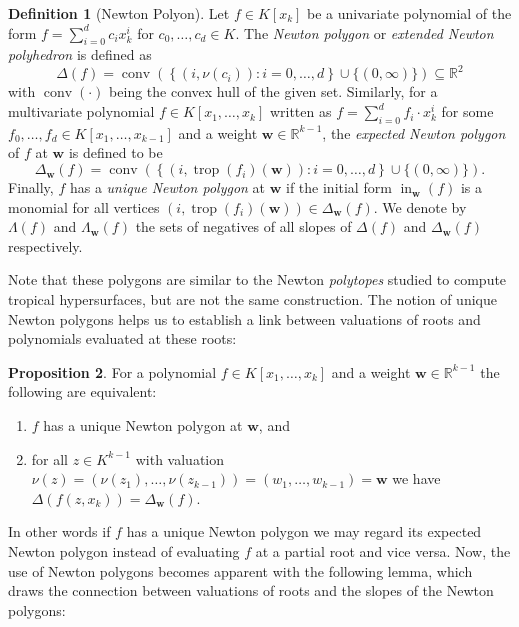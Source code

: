\documentclass[
  paper=a4,
  titlepage,
  bibliography=totoc,
  listof=totoc,
  pagesize=pdftex
]{scrartcl}
\numberwithin{figure}{section}
\numberwithin{equation}{section}
\numberwithin{table}{section}
\newcommand*\setR{\mathds{R}}
\let\vec\mathbf
\DeclareMathOperator{\trop}{trop}
\DeclareMathOperator{\initial}{in}
\DeclareMathOperator{\conv}{conv}
\theoremstyle{definition}
\newtheorem{definition}{Definition}
\newtheorem{proposition}[definition]{Proposition}
\numberwithin{definition}{section}
\begin{document}
\begin{definition}[Newton Polyon]
  Let $f \in K[x_k]$ be a univariate polynomial of the form $f = \sum_{i=0}^d c_i x_k^i$
  for $c_0, \dots, c_d \in K$. The \emph{Newton polygon} or \emph{extended Newton
  polyhedron} is defined as
  \[
    \Delta(f) = \conv \left(
      \left\{ (i, \nu(c_i)) : i = 0, \dots, d \right\}
      \cup \{ (0, \infty) \}
    \right)
    \subseteq \setR^2
  \]
  with $\conv(\cdot)$ being the convex hull of the given set. Similarly, for a
  multivariate polynomial $f \in K[x_1, \dots, x_k]$ written as $f = \sum_{i=0}^d f_i
  \cdot x_k^i$ for some $f_0, \dots, f_d \in K[x_1, \dots, x_{k-1}]$ and a weight $\vec w
  \in \setR^{k-1}$, the \emph{expected Newton polygon} of $f$ at $\vec w$ is defined to be
  \[
    \Delta_{\vec w}(f) = \conv\left(
      \left\{ (i, \trop(f_i)(\vec w)) : i = 0, \dots, d \right\}
      \cup \{ (0, \infty) \}
    \right).
  \]
  Finally, $f$ has a \emph{unique Newton polygon} at $\vec w$ if the initial form
  $\initial_{\vec w}(f)$ is a monomial for all vertices $(i, \trop(f_i)(\vec w)) \in
  \Delta_{\vec w}(f)$. We denote by $\Lambda(f)$ and $\Lambda_{\vec w}(f)$ the sets of
  negatives of all slopes of $\Delta(f)$ and $\Delta_{\vec w}(f)$ respectively.
  \label{def:newtonPoly}
\end{definition}

Note that these polygons are similar to the Newton \emph{polytopes} studied to compute
tropical hypersurfaces, but are not the same construction. The notion of unique Newton
polygons helps us to establish a link between valuations of roots and polynomials
evaluated at these roots:

\begin{proposition}
  \label{prp:expectedNewt}
  For a polynomial $f \in K[x_1, \dots, x_k]$ and a weight $\vec w \in \setR^{k-1}$ the
  following are equivalent:
  \begin{enumerate}
    \item $f$ has a unique Newton polygon at $\vec w$, and
    \item for all $z \in K^{k-1}$ with valuation $\nu(z) = (\nu(z_1), \dots, \nu(z_{k-1}))
      = (w_1, \dots, w_{k-1}) = \vec w$ we have $\Delta(f(z, x_k)) = \Delta_{\vec w}(f)$.
  \end{enumerate}
\end{proposition}

In other words if $f$ has a unique Newton polygon we may regard its expected Newton
polygon instead of evaluating $f$ at a partial root and vice versa. Now, the use of Newton
polygons becomes apparent with the following lemma, which draws the connection between
valuations of roots and the slopes of the Newton polygons:
\end{document}
